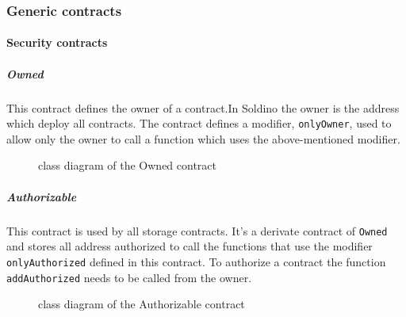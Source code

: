 \subsubsection{Generic contracts}
\paragraph{Security contracts}
\subparagraph{Owned}
This contract defines the owner of a contract.In Soldino the owner is the address which deploy all contracts. The contract defines a modifier, \texttt{onlyOwner}, used to allow only the owner to call a function which uses 
the above-mentioned modifier.
\begin{figure}[H]
	\centering
	\caption{class diagram of the Owned contract}
\end{figure}

\subparagraph{Authorizable}
This contract is used by all storage contracts. It's a derivate contract of \texttt{Owned} and stores 
all address authorized to call the functions that use the modifier \texttt{onlyAuthorized} defined in this contract.
To authorize a contract the function \texttt{addAuthorized} needs to be called from the owner.
\begin{figure}[H]
	\centering
	\caption{class diagram of the Authorizable contract}
\end{figure}
\pagebreak
